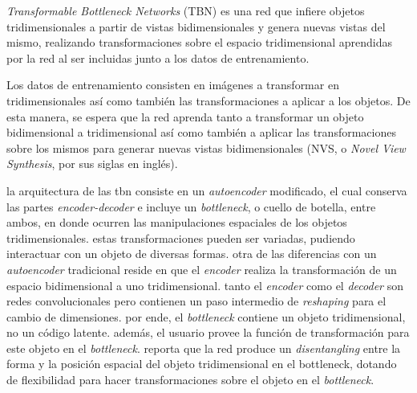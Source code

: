 \documentclass[spanish]{article}
\begin{document}
\textit{Transformable Bottleneck Networks} (TBN) \cite{Olszewski2019} es una red
que infiere objetos tridimensionales a partir de vistas bidimensionales y genera
nuevas vistas del mismo, realizando transformaciones sobre el espacio
tridimensional aprendidas por la red al ser incluidas junto a los datos de
entrenamiento.

Los datos de entrenamiento consisten en imágenes a transformar en tridimensionales así como también las
transformaciones a aplicar a los objetos. De esta manera, se espera que la red aprenda tanto a transformar
un objeto bidimensional a tridimensional así como también a aplicar las transformaciones sobre los mismos
para generar nuevas vistas bidimensionales (NVS, o \textit{Novel View Synthesis}, por sus siglas en inglés).

la arquitectura de las tbn consiste en un \textit{autoencoder} modificado, el cual conserva las partes
\textit{encoder-decoder} e incluye un \textit{bottleneck}, o cuello de botella, entre ambos, en donde ocurren
las manipulaciones espaciales de los objetos tridimensionales. estas transformaciones pueden ser variadas,
pudiendo interactuar con un objeto de diversas formas.
otra de las diferencias con un \textit{autoencoder} tradicional reside en que el \textit{encoder} realiza la
transformación de un espacio bidimensional a uno tridimensional. tanto el \textit{encoder} como el
\textit{decoder} son redes convolucionales pero contienen un paso intermedio de \textit{reshaping} para
el cambio de dimensiones. por ende, el \textit{bottleneck} contiene un objeto tridimensional, no un código latente.
además, el usuario provee la función de transformación para este objeto en el \textit{bottleneck}.  
\cite{olszewski2019} reporta que la red produce un \textit{disentangling} entre la forma y la posición espacial
del objeto tridimensional en el bottleneck, dotando de flexibilidad para hacer transformaciones sobre el objeto
en el \textit{bottleneck}.

\end{document}
